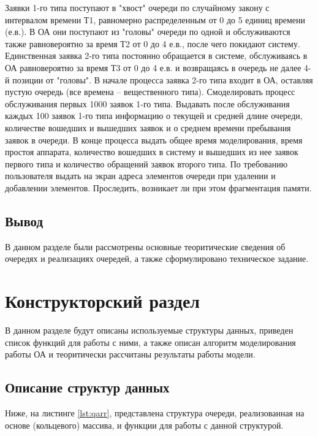 Заявки  1-го  типа  поступают  в  "хвост"  очереди  по  случайному  закону  с 
интервалом  времени  Т1, равномерно  распределенным  от  0  до  5 единиц 
времени  (е.в.).  В  ОА  они  поступают  из  "головы"  очереди  по  одной  и 
обслуживаются  также  равновероятно  за  время  Т2  от  0  до  4  е.в.,  после  чего 
покидают систему. 
Единственная  заявка  2-го  типа  постоянно  обращается  в  системе, 
обслуживаясь в ОА равновероятно за время Т3 от 0 до 4 е.в. и возвращаясь в 
очередь не далее 4-й позиции от "головы". В начале процесса заявка 2-го типа 
входит в ОА, оставляя пустую очередь (все времена – вещественного типа). 
Смоделировать  процесс  обслуживания  первых  1000  заявок  1-го  типа. 
Выдавать  после  обслуживания  каждых  100  заявок  1-го  типа  информацию  о 
текущей и средней длине очереди, количестве вошедших и вышедших заявок и 
о  среднем  времени  пребывания  заявок  в  очереди.  В  конце  процесса  выдать 
общее время моделирования, время простоя аппарата, количество вошедших в 
систему  и  вышедших  из  нее  заявок  первого  типа  и  количество  обращений 
заявок  второго  типа.  По  требованию  пользователя  выдать  на  экран  адреса 
элементов  очереди  при  удалении  и  добавлении  элементов.  Проследить, 
возникает ли при этом фрагментация памяти.

\section{Вывод}

В данном разделе были рассмотрены основные теоритические сведения об очередях и реализациях очередей, а также сформулировано техническое задание.

\chapter{Конструкторский раздел}

В данном разделе будут описаны используемые структуры данных, приведен список функций для работы с ними, а также описан алгоритм моделирования работы ОА и теоритически рассчитаны результаты работы модели.

\section{Описание структур данных}

Ниже, на листинге \ref{lst:qarr}, представлена структура очереди, реализованная на основе (кольцевого) массива, и функции для работы с данной структурой.

